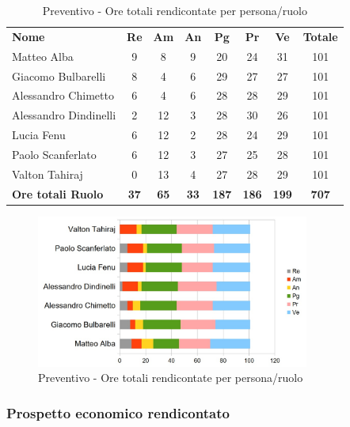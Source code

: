 		\begin{table} [h!]
			\begin{center}
				\begin{tabular} { m{3.5cm} c c c c c c c }
					\rowcolor{lightgray}
					\textbf{Nome} & \textbf{Re} & \textbf{Am} & \textbf{An} & \textbf{Pg} & \textbf{Pr} & \textbf{Ve} & \textbf{Totale} \\
					Matteo Alba & 9 & 8 & 9 & 20 & 24 & 31 & 101 \\
					Giacomo Bulbarelli & 8 & 4 & 6 & 29 & 27 & 27 & 101 \\
					Alessandro Chimetto & 6 & 4 & 6 & 28 & 28 & 29 & 101 \\
					Alessandro Dindinelli & 2 & 12 & 3 & 28 & 30 & 26 & 101 \\
					Lucia Fenu & 6 & 12 & 2 & 28 & 24 & 29 & 101 \\
					Paolo Scanferlato & 6 & 12 & 3 & 27 & 25 & 28 & 101 \\
					Valton Tahiraj & 0 & 13 & 4 & 27 & 28 & 29 & 101 \\
					\textbf{Ore totali Ruolo} & \textbf{37} & \textbf{65} & \textbf{33} & \textbf{187} & \textbf{186}& \textbf{199} & \textbf{707}
				\end{tabular}
				\caption{Preventivo - Ore totali rendicontate per persona/ruolo}
			\end{center}
		\end{table}
	
		\begin{figure} [h!]
			\centering
			\includegraphics[width=0.8\textwidth]{res/img/grafici/OreRendicontate.jpg}
			\caption{Preventivo - Ore totali rendicontate per persona/ruolo} 
		\end{figure}
	
	\newpage
	
	\subsubsection{Prospetto economico rendicontato}
	
